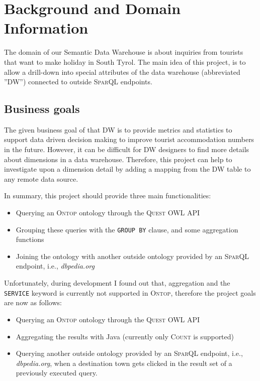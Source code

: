 \section{Background and Domain Information}
\label{chapter:background}

The domain of our Semantic Data Warehouse is about inquiries from tourists that want to make holiday in South Tyrol. The main idea of this project, is to allow a drill-down into special attributes of the data warehouse (abbreviated ''DW'') connected to outside \textsc{SparQL} endpoints. 

\subsection{Business goals}

The given business goal of that DW is to provide metrics and statistics to support data driven decision making to improve tourist accommodation numbers in the future. However, it can be difficult for DW designers to find more details about dimensions in a data warehouse. Therefore, this project can help to investigate upon a dimension detail by adding a mapping from the DW table to any remote data source.

In summary, this project should provide three main functionalities:
\begin{itemize}
\item Querying an \textsc{Ontop} ontology through the \textsc{Quest OWL API}
\item Grouping these queries with the \texttt{GROUP BY} clause, and some aggregation functions
\item Joining the ontology with another outside ontology provided by an \textsc{SparQL} endpoint, i.e., \textit{dbpedia.org}
\end{itemize}

Unfortunately, during development I found out that, aggregation and the \texttt{SERVICE} keyword is currently not supported in \textsc{Ontop}, therefore the project goals are now as follows:
\begin{itemize}
\item Querying an \textsc{Ontop} ontology through the \textsc{Quest OWL API}
\item Aggregating the results with Java (currently only \textsc{Count} is supported) 
\item Querying another outside ontology provided by an \textsc{SparQL} endpoint, i.e., \textit{dbpedia.org}, when a destination town gets clicked in the result set of a previously executed query.
\end{itemize}

